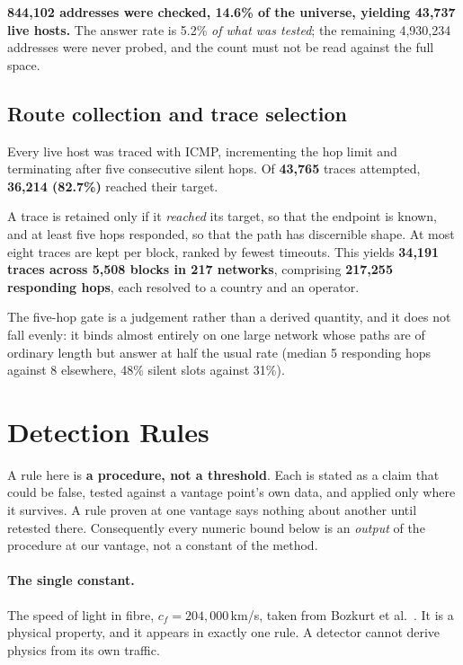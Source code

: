 \textbf{844{,}102 addresses were checked, 14.6\% of the universe, yielding 43{,}737 live
hosts.} The answer rate is 5.2\% \emph{of what was tested}; the remaining 4{,}930{,}234
addresses were never probed, and the count must not be read against the full space.

\subsection{Route collection and trace selection}
\label{sec:routes}

Every live host was traced with ICMP, incrementing the hop limit and terminating after
five consecutive silent hops. Of \textbf{43{,}765} traces attempted, \textbf{36{,}214
(82.7\%)} reached their target.

A trace is retained only if it \emph{reached} its target, so that the endpoint is known,
and at least five hops responded, so that the path has discernible shape. At most eight
traces are kept per block, ranked by fewest timeouts. This yields \textbf{34{,}191 traces
across 5{,}508 blocks in 217 networks}, comprising \textbf{217{,}255 responding hops},
each resolved to a country and an operator.

The five-hop gate is a judgement rather than a derived quantity, and it does not fall
evenly: it binds almost entirely on one large network whose paths are of ordinary length
but answer at half the usual rate (median 5 responding hops against 8 elsewhere, 48\%
silent slots against 31\%).

\section{Detection Rules}
\label{sec:rules}

A rule here is \textbf{a procedure, not a threshold}. Each is stated as a claim that could
be false, tested against a vantage point's own data, and applied only where it survives. A
rule proven at one vantage says nothing about another until retested there. Consequently
every numeric bound below is an \emph{output} of the procedure at our vantage, not a
constant of the method.

\paragraph{The single constant.} The speed of light in fibre, $c_f = 204{,}000$\,km/s,
taken from Bozkurt et al.~\cite{bozkurt:dissecting:2018}. It is a physical property, and
it appears in exactly one rule. A detector cannot derive physics from its own traffic.


